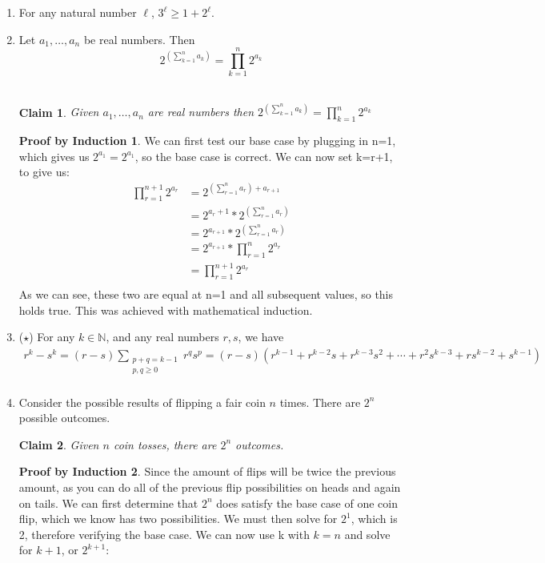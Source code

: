 \documentclass[11pt]{letter}
\newtheorem{claim}{Claim}
\theoremstyle{definition}
\newtheorem{PBI}{Proof by Induction}
\begin{document}
\begin{description}
\begin{enumerate}
			\item For any natural number $\ell$, $3^\ell\geq 1+2^\ell$.
			\item Let $a_1,\ldots, a_n$ be real numbers. Then
				$$2^{\left(\sum_{k=1}^n a_k\right)}=\prod_{k=1}^n 2^{a_k}$$ \\
\begin{claim}
Given $a_1,\ldots, a_n$ are real numbers then $2^{\left(\sum_{k=1}^n a_k\right)}=\prod_{k=1}^n 2^{a_k}$ \\
\end{claim}
\begin{PBI}
We can first test our base case by plugging in n=1, which gives us $2^{a_1}=2^{a_1}$, so the base case is correct. We can now set k=r+1, to give us: \\
\begin{align*}
\prod_{r=1}^{n+1} 2^{a_r}&=2^{\left(\sum_{r=1}^n a_{r}\right) +a_{r+1}} \tag{replaces k with r+1} \\
&=2^{a_r+1}*2^{\left(\sum_{r=1}^n a_{r}\right)} \\
&=2^{a_{r+1}}*2^{\left(\sum_{r=1}^n a_{r}\right)} \tag{Substituted using inductive assumption}\\
&=2^{a_{r+1}}*\prod_{r=1}^n 2^{a_r} \\
&=\prod_{r=1}^{n+1} 2^{a_r} \\
\end{align*}
As we can see, these two are equal at n=1 and all subsequent values, so this holds true. This was achieved with mathematical induction. \\
\end{PBI}
			\item ($\star$) For any $k\in\mathbb{N}$, and any real numbers $r,s$, we have 
				\begin{align*}
					r^k-s^k=(r-s)\sum_{\substack{p+q=k-1\\p,q\geq 0}} r^qs^p=(r-s)\left(r^{k-1}+r^{k-2}s+r^{k-3}s^2+\cdots+r^2s^{k-3}+rs^{k-2}+s^{k-1}\right) \\
				\end{align*}
			\item Consider the possible results of flipping a fair coin $n$ times. There are $2^n$ possible outcomes. 
\begin{claim}
Given $n$ coin tosses, there are $2^n$ outcomes.
\end{claim}
\begin{PBI}
Since the amount of flips will be twice the previous amount, as you can do all of the previous flip possibilities on heads and again on tails. We can first determine that $2^n$ does satisfy the base case of one coin flip, which we know has two possibilities. We must then solve for $2^1$, which is 2, therefore verifying the base case. We can now use k with $k=n$ and solve for $k+1$, or $2^{k+1}$:\\

\end{PBI}
\end{enumerate}
\end{description}
\end{document}
